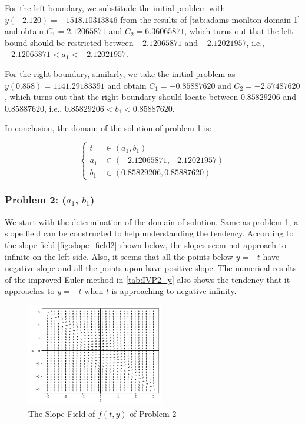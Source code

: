 \documentclass[a4paper]{article}
\begin{document}
    For the left boundary, we substitude the initial problem with $y(-2.120) = -1518.10313846$ from the results of \autoref{tab:adams-monlton-domain-1} and obtain $C_1 = 2.12065871$ and $C_2 = 6.36065871$, which turns out that the left bound should be restricted between $-2.12065871$ and $-2.12021957$, i.e., $-2.12065871 < a_1 < -2.12021957$.
    
    For the right boundary, similarly, we take the initial problem as $y(0.858) = 1141.29183391$ and obtain $C_1 = -0.85887620$ and $C_2 = -2.57487620$, which turns out that the right boundary should locate between $0.85829206$ and $0.85887620$, i.e., $0.85829206 < b_1 < 0.85887620$. 
	
	In conclusion, the domain of the solution of problem 1 is:
	
	$$
	\left\{
    	\begin{aligned}
    	    t &\in (a_1, b_1) \nonumber \\
    	    a_1 &\in (-2.12065871, -2.12021957) \nonumber \\
    	    b_1 &\in (0.85829206, 0.85887620) \nonumber
    	\end{aligned}
	\right.
	$$
	
		
	\subsubsection{Problem 2: ($a_1$, $b_1$)}
	
    We start with the determination of the domain of solution. Same as problem 1, a slope field can be constructed to help understanding the tendency. According to the slope field \autoref{fig:slope_field2} shown below, the slopes seem not approach to infinite on the left side. Also, it seems that all the points below $y= -t$ have negative slope and all the points upon have positive slope. The numerical results of the improved Euler method in \autoref{tab:IVP2_y} also shows the tendency that it approaches to $y = -t$ when $t$ is approaching to negative infinity. 
	
	\begin{figure}[H]
		\centering
		\includegraphics[width=6cm]{img/slope_field2.png}
		\caption{\label{fig:slope_field2} The Slope Field of $f(t, y)$ of Problem 2}
	\end{figure}
	
\end{document}
